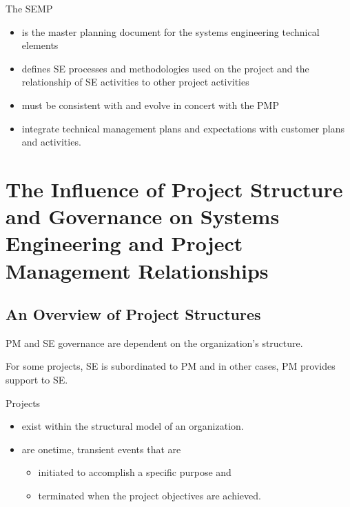 \documentclass[letterpaper,10pt,english]{jupyterBook}
\begin{document}
\sphinxAtStartPar
The SEMP
\begin{itemize}
\item {} 
\sphinxAtStartPar
is the master planning document for the
systems engineering technical elements

\item {} 
\sphinxAtStartPar
defines SE processes and methodologies used on the project and the relationship of SE activities to other project activities

\item {} 
\sphinxAtStartPar
must be consistent with and evolve in concert with
the PMP

\item {} 
\sphinxAtStartPar
integrate technical management plans and expectations  with customer plans and activities.

\end{itemize}


\section{The Influence of Project Structure and Governance on Systems Engineering and Project Management Relationships}
\label{\detokenize{SE/sebok:the-influence-of-project-structure-and-governance-on-systems-engineering-and-project-management-relationships}}

\subsection{An Overview of Project Structures}
\label{\detokenize{SE/sebok:an-overview-of-project-structures}}
\sphinxAtStartPar
PM and SE governance are dependent on the organization’s structure.

\sphinxAtStartPar
For some projects, SE is subordinated to PM and in other cases, PM provides support to SE.

\sphinxAtStartPar
Projects
\begin{itemize}
\item {} 
\sphinxAtStartPar
exist within the structural model of an organization.

\item {} 
\sphinxAtStartPar
are one\sphinxhyphen{}time, transient events that are
\begin{itemize}
\item {} 
\sphinxAtStartPar
initiated to accomplish a specific purpose and

\item {} 
\sphinxAtStartPar
terminated when the project objectives are achieved.

\end{itemize}

\end{itemize}
\end{document}
